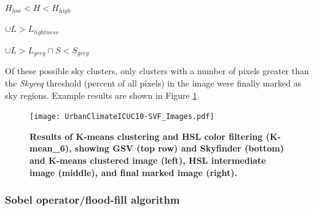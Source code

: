 \documentclass[final,3p,times,authoryear]{elsarticle}
\begin{document}
$H_{low} < H < H_{high}$

$\cup L > L_{lightness}$

$\cup L > L_{grey} \cap S < S_{grey}$

Of these possible sky clusters, only clusters with a number of pixels greater than the \textit{Skyreq} threshold (percent of all pixels) in the image were finally marked as sky regions. Example results are shown in Figure \ref{fig:kmeansresults}. 


\begin{figure}
\centering 
\texttt{[image: UrbanClimateICUC10-SVF\_Images.pdf]}
\caption{\bf Results of K-means clustering and HSL color filtering (K-mean\_6), showing GSV (top row) and Skyfinder (bottom) and K-means clustered image (left), HSL intermediate image (middle), and final marked image (right).}    
 \label{fig:kmeansresults}  
\end{figure} 



\subsubsection{\cite{Middel2018} Sobel operator/flood-fill algorithm}\label{sec:floodfill}
\end{document}
